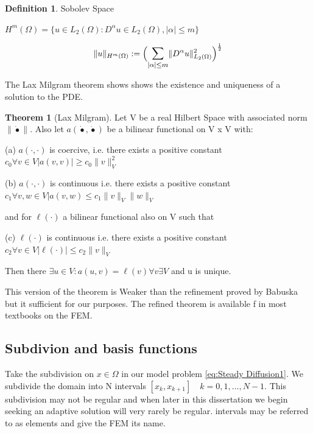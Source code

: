\documentclass{uonmathreport}
\theoremstyle{definition}
\newtheorem{definition}{Definition}[section]
\theoremstyle{problem}
\theoremstyle{theorem}
\newtheorem{theorem}{Theorem}[section]
\begin{document}
\theoremstyle{definition}
\begin{definition}{Sobolev Space}

$H^{m}(\Omega) = \{ u \in L_2(\Omega) : D^{\alpha} u \in L_2(\Omega), |\alpha| \leq m \}$

$$\|u\|_{H^m(\Omega)} :=  \Big(\mathlarger{\sum_{|\alpha|\leq m}}\|D^{\alpha}u\|^2_{L_2(\Omega)} \Big)^{\frac{1}{2}} $$


\end{definition}

The Lax Milgram theorem shows shows the existence and uniqueness of a solution to the PDE. 


\begin{theorem}[Lax Milgram]
\label{Lax Milgram}
Let V be a real Hilbert Space with associated norm $\|\dot{•}\|$. Also let $a(\dot{•}, \dot{•})$ be a bilinear functional on V x V with:

(a) $a(\cdot, \cdot)$ is coercive, i.e. there exists a positive constant $c_0 \forall v \in V |a(v, v)|  \geq c_0 \|v\|^2_V$ 

(b) $a(\cdot, \cdot)$ is continuous i.e. there exists a positive constant $c_1 \forall v, w \in V |a(v, w) \leq c_1 \|v\|_V \|w\|_V$ 

and for $\ell(\cdot)$ a bilinear functional also on V such that 

(c) $\ell(\cdot)$ is continuous i.e. there exists a positive constant $c_2 \forall v \in V |\ell(\cdot)|  \leq c_2 \|v\|_V$

Then there $\exists u \in V: a(u, v) = \ell(v) \forall v \exists V$ and u is unique.
\end{theorem}

This version of the theorem is Weaker than the refinement proved by Babuska but it sufficient for our purposes. The refined theorem is available f in most textbooks on the FEM.




\clearpage

\subsection{Subdivion and basis functions} \label{subsec:Subspace}

Take the subdivision on $x \in \Omega$ in our model problem \ref{eq:Steady Diffusion1}. We subdivide the domain into N intervals $[x_k, x_{k+1}] \quad k=0, 1, ... , N-1$. This subdivision may not be regular and when later in this dissertation we begin seeking an adaptive solution will very rarely be regular. intervals may be referred to as elements and give the FEM its name.
\\
\\
\end{document}
